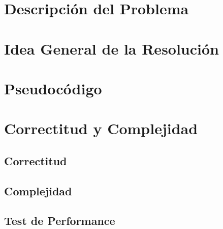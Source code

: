 \section{Descripci\'on del Problema}


\section{Idea General de la Resoluci\'on}


\section{Pseudoc\'odigo}


\section{Correctitud y Complejidad}

\subsection{Correctitud}

 
\subsection{Complejidad}


\subsection{Test de Performance}

